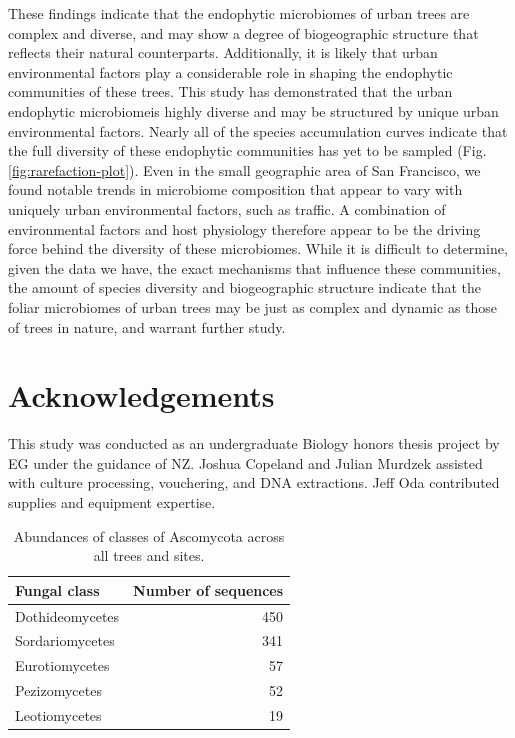 \documentclass[fleqn,10pt,lineno]{wlpeerj} %
\begin{document}
These findings indicate that the endophytic microbiomes of urban trees are complex and diverse, and may show a degree of biogeographic structure that reflects their natural counterparts. Additionally, it is likely that urban environmental factors play a considerable role in shaping the endophytic communities of these trees. This study has demonstrated that the urban endophytic microbiomeis highly diverse and may be structured by unique urban environmental factors. Nearly all of the species accumulation curves indicate that the full diversity of these endophytic communities has yet to be sampled (Fig. \ref{fig:rarefaction-plot}). Even in the small geographic area of San Francisco, we found notable trends in microbiome composition that appear to vary with uniquely urban environmental factors, such as traffic. A combination of environmental factors and host physiology therefore appear to be the driving force behind the diversity of these microbiomes. While it is difficult to determine, given the data we have, the exact mechanisms that influence these communities, the amount of species diversity and biogeographic structure indicate that the foliar microbiomes of urban trees may be just as complex and dynamic as those of trees in nature, and warrant further study.

\hypertarget{acknowledgements}{%
\section*{Acknowledgements}\label{acknowledgements}}

This study was conducted as an undergraduate Biology honors thesis project by EG under the guidance of NZ. Joshua Copeland and Julian Murdzek assisted with culture processing, vouchering, and DNA extractions. Jeff Oda contributed supplies and equipment expertise.

\begin{table}[!h]

\caption{\label{tab:class-abundance-table}Abundances of classes of Ascomycota across all trees and sites.}
\centering
\begin{tabular}[t]{lr}
\toprule
Fungal class & Number of sequences\\
\midrule
Dothideomycetes & 450\\
Sordariomycetes & 341\\
Eurotiomycetes & 57\\
Pezizomycetes & 52\\
Leotiomycetes & 19\\
\bottomrule
\end{tabular}
\end{table}
\end{document}
